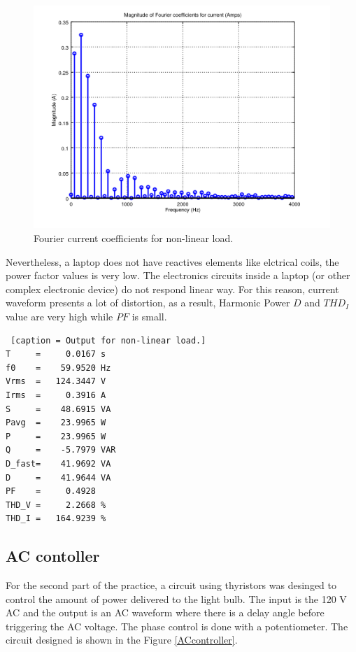 \documentclass[journal]{IEEEtran}
\begin{document}
\begin{figure}[h]
\centering
\includegraphics[clip,width=\columnwidth]
{zoomed_current_furier_coefficients_computer.png}
\caption{Fourier current coefficients for non-linear load.}
\label{fourier_corrent_coefficients_nonlinear}
\end{figure}

Nevertheless, a laptop does not have reactives elements 
like elctrical coils, the power factor values is very 
low. The electronics circuits inside a laptop (or other 
complex electronic device) do not respond linear way. 
For this reason, current waveform presents a lot of 
distortion, as a result, Harmonic Power $D$ and $THD_I$ 
value are very high while $PF$ is small. 

\begin{lstlisting} [caption = Output for non-linear load.]
T     =     0.0167 s 
f0    =    59.9520 Hz 
Vrms  =   124.3447 V
Irms  =     0.3916 A
S     =    48.6915 VA
Pavg  =    23.9965 W 
P     =    23.9965 W 
Q     =    -5.7979 VAR 
D_fast=    41.9692 VA 
D     =    41.9644 VA 
PF    =     0.4928 
THD_V =     2.2668 %
THD_I =   164.9239 %
\end{lstlisting}

\subsection{AC contoller}

For the second part of the practice, a 
circuit using thyristors  was desinged to control 
the amount of power delivered to the light bulb. 
The input is the 120 V AC and 
the output is an AC waveform where there is a delay angle 
before triggering the AC voltage. The phase control is 
done with a potentiometer. The circuit designed is shown 
in the Figure \ref{ACcontroller}.
\end{document}
